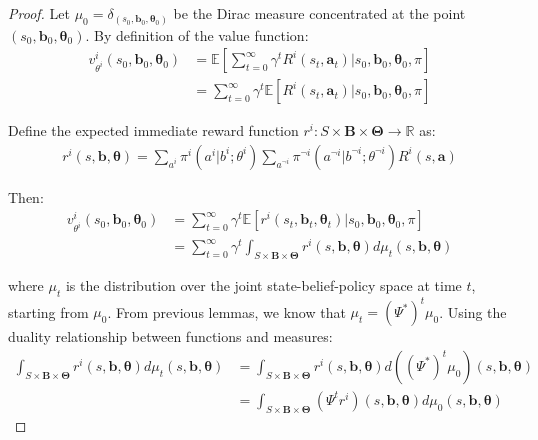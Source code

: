 \begin{proof}
    Let $\mu_{0} = \delta_{(s_0, \boldsymbol{b}_0, \boldsymbol{\theta}_0)}$ be the
    Dirac measure concentrated at the point $(s_{0}, \boldsymbol{b}_{0}, \boldsymbol
        {\theta}_{0})$. By definition of the value function:
    \begin{align}
        v^{i}_{\theta^i}(s_{0}, \boldsymbol{b}_{0}, \boldsymbol{\theta}_{0}) & = \mathbb{E}\left[ \sum_{t=0}^{\infty}\gamma^{t} R^{i}(s_{t}, \boldsymbol{a}_{t}) \bigg| s_{0}, \boldsymbol{b}_{0}, \boldsymbol{\theta}_{0}, \pi \right] \\
                                                                             & = \sum_{t=0}^{\infty}\gamma^{t} \mathbb{E}\left[ R^{i}(s_{t}, \boldsymbol{a}_{t}) \bigg| s_{0}, \boldsymbol{b}_{0}, \boldsymbol{\theta}_{0}, \pi \right]
    \end{align}

    Define the expected immediate reward function
    $r^{i}: S \times \boldsymbol{B}\times \boldsymbol{\Theta}\to \mathbb{R}$ as:
    \begin{align}
        r^{i}(s, \boldsymbol{b}, \boldsymbol{\theta}) = \sum_{a^i}\pi^{i}(a^{i}|b^{i}; \theta^{i}) \sum_{a^{\neg i}}\pi^{\neg i}(a^{\neg i}|b^{\neg i}; \theta^{\neg i}) R^{i}(s, \boldsymbol{a})
    \end{align}

    Then:
    \begin{align}
        v^{i}_{\theta^i}(s_{0}, \boldsymbol{b}_{0}, \boldsymbol{\theta}_{0}) & = \sum_{t=0}^{\infty}\gamma^{t} \mathbb{E}\left[ r^{i}(s_{t}, \boldsymbol{b}_{t}, \boldsymbol{\theta}_{t}) \bigg| s_{0}, \boldsymbol{b}_{0}, \boldsymbol{\theta}_{0}, \pi \right]       \\
                                                                             & = \sum_{t=0}^{\infty}\gamma^{t} \int_{S \times \boldsymbol{B} \times \boldsymbol{\Theta}}r^{i}(s, \boldsymbol{b}, \boldsymbol{\theta}) d\mu_{t}(s, \boldsymbol{b}, \boldsymbol{\theta})
    \end{align}

    where $\mu_{t}$ is the distribution over the joint state-belief-policy space
    at time $t$, starting from $\mu_{0}$. From previous lemmas, we know that $\mu_{t}
        = (\Psi^{*})^{t} \mu_{0}$. Using the duality relationship between functions
    and measures:
    \begin{align}
        \int_{S \times \boldsymbol{B} \times \boldsymbol{\Theta}}r^{i}(s, \boldsymbol{b}, \boldsymbol{\theta}) d\mu_{t}(s, \boldsymbol{b}, \boldsymbol{\theta}) & = \int_{S \times \boldsymbol{B} \times \boldsymbol{\Theta}}r^{i}(s, \boldsymbol{b}, \boldsymbol{\theta}) d((\Psi^{*})^{t}\mu_{0})(s, \boldsymbol{b}, \boldsymbol{\theta}) \\
                                                                                                                                                                & = \int_{S \times \boldsymbol{B} \times \boldsymbol{\Theta}}(\Psi^{t} r^{i})(s, \boldsymbol{b}, \boldsymbol{\theta}) d\mu_{0}(s, \boldsymbol{b}, \boldsymbol{\theta})
    \end{align}


\end{proof}
